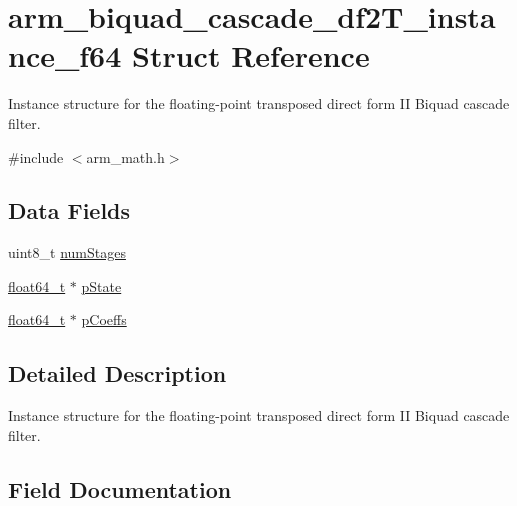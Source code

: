 \hypertarget{structarm__biquad__cascade__df2_t__instance__f64}{}\section{arm\+\_\+biquad\+\_\+cascade\+\_\+df2\+T\+\_\+instance\+\_\+f64 Struct Reference}
\label{structarm__biquad__cascade__df2_t__instance__f64}


Instance structure for the floating-\/point transposed direct form II Biquad cascade filter.  




{\ttfamily \#include $<$arm\+\_\+math.\+h$>$}

\subsection*{Data Fields}
\begin{DoxyCompactItemize}
\item 
uint8\+\_\+t \mbox{\hyperlink{structarm__biquad__cascade__df2_t__instance__f64_a3615af038f56917909e0370c11bc2ec7}{num\+Stages}}
\item 
\mbox{\hyperlink{arm__math_8h_ac55f3ae81b5bc9053760baacf57e47f4}{float64\+\_\+t}} $\ast$ \mbox{\hyperlink{structarm__biquad__cascade__df2_t__instance__f64_ae97c926a7e3a4bfe26fcdd0a3cc2f5c6}{p\+State}}
\item 
\mbox{\hyperlink{arm__math_8h_ac55f3ae81b5bc9053760baacf57e47f4}{float64\+\_\+t}} $\ast$ \mbox{\hyperlink{structarm__biquad__cascade__df2_t__instance__f64_a2f5f42f60a50d7cb39837fd9b80cd8f0}{p\+Coeffs}}
\end{DoxyCompactItemize}


\subsection{Detailed Description}
Instance structure for the floating-\/point transposed direct form II Biquad cascade filter. 

\subsection{Field Documentation}
\mbox{\label{structarm__biquad__cascade__df2_t__instance__f64_a3615af038f56917909e0370c11bc2ec7}} 
